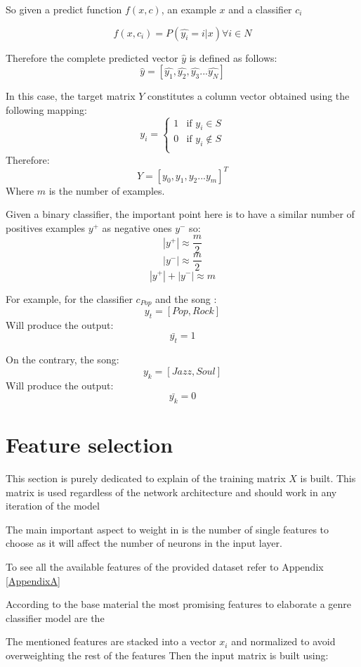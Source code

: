 So given a predict function  $f(x, c)$, an example $x$ and a classifier $c_i$ 

$$ f(x, c_i) =  P(\hat{y_i} = i | x) \forall i \in N $$

Therefore the complete predicted vector $\hat{y}$ is defined as follows:
$$ \hat{y} = [ \hat{y_1}, \hat{y_2}, \hat{y_3} ... \hat{y_N} ] $$

In this case, the target matrix \(Y\) constitutes a column vector obtained using the following mapping:
$$ {y_i} =
\begin{cases}
    1 & \text{if } y_i \in S\\
    0 & \text{if } y_i \notin S\\
\end{cases}
$$
Therefore:
$$ Y = [y_0, y_1, y_2 ... y_m]^T $$
Where $m$ is the number of examples.

Given a binary classifier, the important point here is to have a similar number of positives examples $y^+$ as negative ones $y^-$ so:
$$ |y^+|  \approx \frac{m}{2} $$
$$ |y^-|  \approx \frac{m}{2} $$
$$ |y^+| + |y^-| \approx m $$

For example, for the classifier $c_{Pop}$ and the song :
$$ y_t  = [ Pop, Rock ] $$
Will produce the output:
$$ \bar{y_t}  = 1 $$

On the contrary, the song:
$$ y_k  = [ Jazz, Soul ] $$
Will produce the output:
$$ \bar{y_k}  = 0 $$


\section{Feature selection}
This section is purely dedicated to explain of the training matrix $X$ is built.
This matrix is used regardless of the network architecture and should work in any iteration of the model

The main important aspect to weight in is the number of single features to choose as it will affect the number of neurons in the input layer.

To see all the available features of the provided dataset refer to Appendix \ref{AppendixA}

According to the base material the most promising features to elaborate a genre classifier model are the \cite{}

The mentioned features are stacked into a vector $x_i$ and normalized to avoid overweighting the rest of the features 
Then the input matrix is built using:


